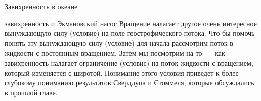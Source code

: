 \begin{chapter}{Завихренность в океане}
\begin{section}{завихренность и Экмановский насос}
Вращение налагает другое очень интересное вынуждающую силу (условие)
на поле геострофического потока. Что бы помочь понять эту вынуждающую
силу (условие) для начала рассмотрим поток в жидкости с постоянным
вращением. Затем мы посмотрим на то~--- как завихренность налагает
ограничение (условие) на поток жидкости с вращением, который
изменяется с широтой. Понимание этого условия приведет к более
глубокому пониманию результатов Свердлупа и Стоммеля, которые
обсуждались в прошлой главе.
%


\end{section}
\end{chapter}
